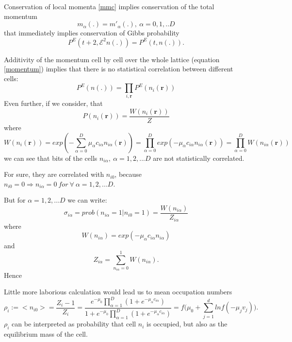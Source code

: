 Conservation of local momenta \ref{mmc} implies conservation of the total momentum
\begin{equation}
m_{\alpha}(.) = m'_{\alpha}(.),~\alpha=0,1,..D
\end{equation}
that immediately implies conservation of Gibbs probability
\begin{equation}
P^E(t+2,\mathcal{E}^2n(.)) = P^E(t,n(.)).
\end{equation}

Additivity of the momentum cell by cell over the whole lattice (equation \ref{momentum}) implies that there is no statistical correlation between different cells:
\begin{equation}
P^E(n(.)) = \prod_{i,\bm{r}} P^E(n_i(\bm{r}))
\end{equation} 
Even further, if we consider, that
\begin{equation}
P(n_i(\bm{r})) = \frac{W(n_i(\bm{r}))}{Z}
\end{equation}
where
\begin{equation}
W(n_i(\bm{r}))=exp(-\sum_{\alpha = 0}^D\mu_{\alpha}c_{i\alpha}n_{i\alpha}(\bm{r})) = \prod_{\alpha=0}^Dexp(-\mu_{\alpha}c_{i\alpha}n_{i\alpha}(\bm{r})) = \prod_{\alpha = 0}^D W(n_{i\alpha}(\bm{r}))
\end{equation}
we can see that bits of the cells $n_{i\alpha},~\alpha = 1,2,...D$ are not statistically correlated.

For sure, they are correlated with $n_{i0}$, because $n_{i0} = 0 \Rightarrow n_{i\alpha} = 0~ for~ \forall ~ \alpha = 1,2,...D$.

But for $\alpha=1,2,...D$ we can write:
\begin{equation} \label{form2}
\sigma_{i\alpha} = prob(n_{i\alpha} = 1 | n_{i0} = 1) = \frac{W(n_{i\alpha})}{Z_{i\alpha}}
\end{equation}
where
\begin{equation}
W(n_{i\alpha}) = exp(-\mu_{\alpha}c_{i\alpha}n_{i\alpha})
\end{equation}
and
\begin{equation}
Z_{i\alpha} = \sum_{n_{i\alpha}=0}^1 W(n_{i\alpha}). 
\end{equation}
Hence

Little more laborious calculation would lead us to mean occupation numbers
\begin{equation} \label{form1}
\rho_i := <n_{i0}> = \frac{Z_i - 1}{Z_i} = \frac{e^{-\mu_0}\prod_{\alpha = 1}^D(1+e^{-{\mu_{\alpha} c_{i\alpha}}})}{1+e^{-\mu_0}\prod_{\alpha = 1}^D(1+e^{-{\mu_{\alpha} c_{i\alpha}}}) } = f\big(\mu_0 + \sum_{j=1}^d ln f(-\mu_j v_j) \big).
\end{equation}
$\rho_i$ can be interpreted as probability that cell $n_i$ is occupied, but also as the equilibrium mass of the cell.

